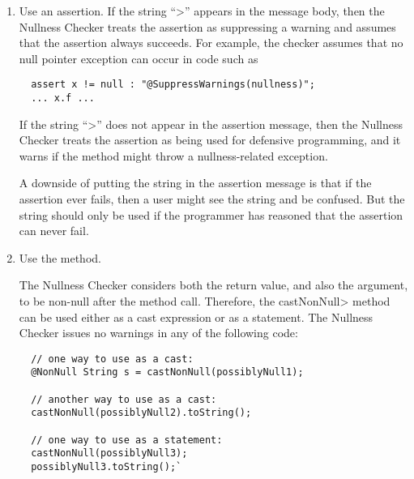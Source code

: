 \begin{enumerate}
\item
  Use an assertion.  If the string ``\<\nullnessSuppressionString>''
  appears in the message body, then the Nullness Checker treats the
  assertion as suppressing a warning and assumes that the assertion always
  succeeds.  For example, the checker assumes that no null pointer
  exception can occur in code such as
\begin{Verbatim}
  assert x != null : "@SuppressWarnings(nullness)";
  ... x.f ...
\end{Verbatim}

  If the string ``\<\nullnessSuppressionString>'' does not appear in the
  assertion message, then the Nullness Checker treats the assertion as being
  used for defensive programming, and it warns if the method might throw a
  nullness-related exception.

  A downside of putting the string in the assertion message is that if the
  assertion ever fails, then a user might see the string and be confused.
  But the string should only be used if the programmer has reasoned that
  the assertion can never fail.


\item
  Use the  method.

The Nullness
 Checker considers both the return value, and also the argument, to
 be non-null after the method call.  Therefore, the
 \<castNonNull> method can be used either as a cast expression or
 as a statement.  The Nullness Checker issues no warnings in any of
the following code:

\begin{Verbatim}
  // one way to use as a cast:
  @NonNull String s = castNonNull(possiblyNull1);

  // another way to use as a cast:
  castNonNull(possiblyNull2).toString();

  // one way to use as a statement:
  castNonNull(possiblyNull3);
  possiblyNull3.toString();`
\end{Verbatim}


\end{enumerate}

